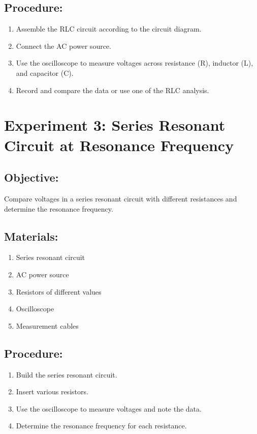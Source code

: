 \documentclass[]{scrreprt}
\begin{document}
    \subsection*{Procedure:}
    \begin{enumerate}
        \item Assemble the RLC circuit according to the circuit diagram.
        \item Connect the AC power source.
        \item Use the oscilloscope to measure voltages across resistance (R), inductor (L), and capacitor (C).
        \item Record and compare the data or use one of the RLC analysis.
    \end{enumerate}

    \section*{Experiment 3: Series Resonant Circuit at Resonance Frequency}
    \subsection*{Objective:} Compare voltages in a series resonant circuit with different resistances and determine the resonance frequency.
    \subsection*{Materials:}
    \begin{enumerate}
        \item Series resonant circuit
        \item AC power source
        \item Resistors of different values
        \item Oscilloscope
        \item Measurement cables
    \end{enumerate}
    \subsection*{Procedure:}
    \begin{enumerate}
        \item Build the series resonant circuit.
        \item Insert various resistors.
        \item Use the oscilloscope to measure voltages and note the data.
        \item Determine the resonance frequency for each resistance.
    \end{enumerate}
\end{document}
